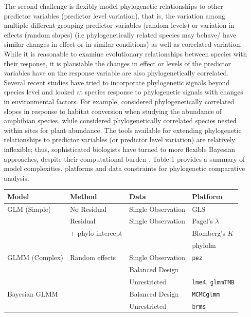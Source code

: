 The second challenge is flexibly model phylogenetic relationships to other predictor variables (predictor level variation), that is, the variation among multiple different grouping predictor variables (random levels) or variation in effects (random slopes) (i.e phylogenetically related species may behave/ have similar changes in effect or in similar conditions) as well as correlated variation.
While it is reasonable to examine evolutionary relationships between species with their response, it is plausiable the changes in effect or levels of the predictor variables have on the response variable are also phylogenetically correlated. 
Several recent studies have tried to incorporate phylogenetic signals beyond species level and looked at species response to phylogenetic signals with changes in environmental factors.
For example, \cite{nowakowski2018phylogenetic} considered phylogenetically correlated slopes in response to habitat conversion when studying the abundance of amphibian species, while \cite{li2017canfun} considered phylogenetically correlated species nested within sites for plant abundance. 
The tools available for extending phylogenetic relationships to predictor variables (or predictor level variation) are relatively inflexible; thus, sophisticated biologists have turned to more flexible Bayesian approaches, despite their computational burden \cite{hadfield2010mcmc, burkner2016brms}.
Table 1 provides a summary of model complexities, platforms and data constraints for phylogenetic comparative analysis.

\newcommand{\pkg}[1]{{\tt #1}}
\newcommand{\code}[1]{{\tt #1}}

\begin{tabularx}{\textwidth}{|X|X|X|X|}
\hline
Model & Method & Data & Platform \\
\hline
\hline
GLM (Simple)  & No Residual & Single Observation & GLS \\
\hline
              & Residual    & Single Observation & Pagel's $\lambda$ \\
              & + phylo intercept &                    & Blomberg's $K$ \\ 
              &             &                    & phylolm \\
\hline
GLMM (Complex)& Random effects & Single Observation & \pkg{pez} \\ 
              &                & Balanced Design &  \\
\hline
              &                & Unrestricted  & \pkg{lme4}, \pkg{glmmTMB} \\
\hline
Bayesian GLMM &                & Balanced Design & \pkg{MCMCglmm} \\ 
\hline        
              &                & Unrestricted   & \pkg{brms} \\
\hline
\end{tabularx}


